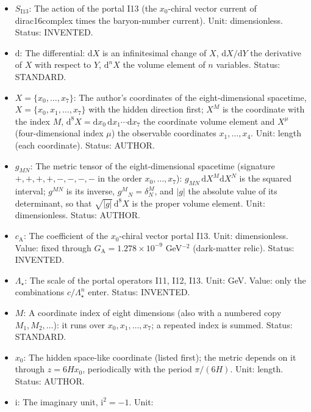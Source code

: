 \documentclass[
  10pt,
]{article}
\providecommand{\tightlist}{%
  \setlength{\itemsep}{0pt}\setlength{\parskip}{0pt}}
\begin{document}
\begin{itemize}
\tightlist
\item
  \(S_{\mathrm{I13}}\): The action of the portal I13 (the \(x_0\)-chiral
  vector current of dirac16complex times the baryon-number current).
  Unit: dimensionless. Status: INVENTED.
\item
  \(\mathrm{d}\): The differential: \(\mathrm{d}X\) is an infinitesimal
  change of \(X\), \(\mathrm{d}X/\mathrm{d}Y\) the derivative of \(X\)
  with respect to \(Y\), \(\mathrm{d}^nX\) the volume element of \(n\)
  variables. Status: STANDARD.
\item
  \(X = \{x_0, \dots, x_7\}\): The author's coordinates of the
  eight-dimensional spacetime, \(X = \{x_0, x_1, \dots, x_7\}\) with the
  hidden direction first; \(X^M\) is the coordinate with the index
  \(M\),
  \(\mathrm{d}^8X = \mathrm{d}x_0\,\mathrm{d}x_1\cdots\mathrm{d}x_7\)
  the coordinate volume element and \(X^\mu\) (four-dimensional index
  \(\mu\)) the observable coordinates \(x_1, \dots, x_4\). Unit: length
  (each coordinate). Status: AUTHOR.
\item
  \(g_{MN}\): The metric tensor of the eight-dimensional spacetime
  (signature \(+,+,+,+,-,-,-,-\) in the order \(x_0, \dots, x_7\)):
  \(g_{MN}\,\mathrm{d}X^M\mathrm{d}X^N\) is the squared interval;
  \(g^{MN}\) is its inverse, \(g^M{}_N = \delta^M_N\), and
  \(\lvert g\rvert\) the absolute value of its determinant, so that
  \(\sqrt{\lvert g\rvert}\,\mathrm{d}^8X\) is the proper volume element.
  Unit: dimensionless. Status: AUTHOR.
\item
  \(c_{\mathrm{A}}\): The coefficient of the \(x_0\)-chiral vector
  portal I13. Unit: dimensionless. Value: fixed through
  \(G_{\mathrm{A}} = 1.278\times10^{-9}\) GeV\(^{-2}\) (dark-matter
  relic). Status: INVENTED.
\item
  \(\Lambda_\star\): The scale of the portal operators I11, I12, I13.
  Unit: GeV. Value: only the combinations \(c/\Lambda_\star^n\) enter.
  Status: INVENTED.
\item
  \(M\): A coordinate index of eight dimensions (also with a numbered
  copy \(M_1, M_2, \dots\)): it runs over \(x_0, x_1, \dots, x_7\); a
  repeated index is summed. Status: STANDARD.
\item
  \(x_0\): The hidden space-like coordinate (listed first); the metric
  depends on it through \(z = 6Hx_0\), periodically with the period
  \(\pi/(6H)\). Unit: length. Status: AUTHOR.
\item
  \(\mathrm{i}\): The imaginary unit, \(\mathrm{i}^2 = -1\). Unit:

\end{itemize}
\end{document}
